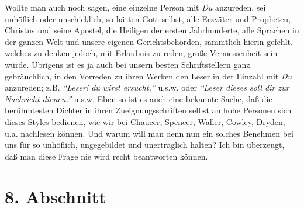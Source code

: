 Wollte man auch noch sagen, eine einzelne Person mit \textit{Du} anzureden, sei
unhöflich oder unschicklich, so hätten Gott selbst, alle Erzväter und Propheten,
Christus und seine Apostel, die Heiligen der ersten Jahrhunderte, alle Sprachen
in der ganzen Welt und unsere eigenen Gerichtsbehörden, sämmtlich hierin
gefehlt. welches zu denken jedoch, mit Erlaubnis zu reden, große Vermessenheit
sein würde. Übrigens ist es ja auch bei unsern besten Schriftstellern ganz
gebräuchlich, in den Vorreden zu ihren Werken den Leser in der Einzahl mit
\textit{Du} anzureden; z.B. \textit{"`Leser! du wirst ersucht,"'} u.s.w. oder
\textit{"`Leser dieses
soll dir zur Nachricht dienen."'} u.s.w. Eben so ist es auch eine bekannte
Sache,
daß die berühmtesten Dichter in ihren Zueignungsschriften selbst an hohe
Personen sich dieses Styles bedienen, wie wir bei
Chaucer, Spencer,
Waller,
Cowley, Dryden, u.a. nachlesen
können. Und warum will man denn nun ein solches
Benehmen bei uns für so unhöflich, ungegebildet und unerträglich halten? Ich bin
überzeugt, daß man diese Frage nie wird recht beantworten können.

\section{8. Abschnitt} \label{kap10_ab8}


